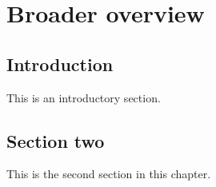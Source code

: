 \chapter{Broader overview}
\label{ch:over}


\section{Introduction}
\label{over:s:intro}

This is an introductory section.

\section{Section two}

This is the second section in this chapter.
